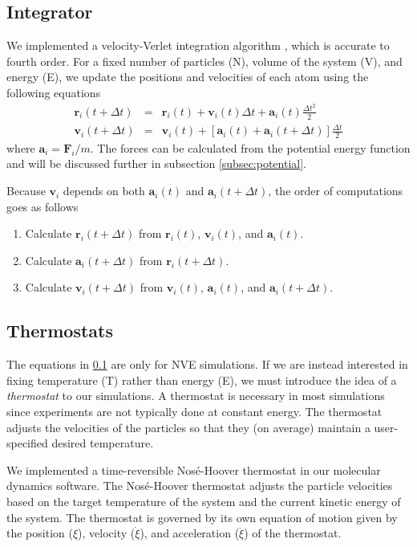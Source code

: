 \subsection{Integrator} \label{subsec:integrator}

We implemented a velocity-Verlet integration algorithm \cite{Swope1982}, which is accurate to fourth order.
%
For a fixed number of particles (N), volume of the system (V), and energy (E), we update the positions and velocities of each atom using the following equations
\begin{eqnarray}
\mathbf{r}_i (t + \Delta t)  & = & \mathbf{r}_i(t) + \mathbf{v}_i(t) \Delta t + \mathbf{a}_i(t) \frac{\Delta t^2}{2} \\
\mathbf{v}_i(t + \Delta t) & = & \mathbf{v}_i(t) + \left[\mathbf{a}_i(t) + \mathbf{a}_i(t + \Delta t) \right] \frac{\Delta t}{2}
\end{eqnarray}
where $\mathbf{a}_i = \mathbf{F}_i/m$.
%
The forces can be calculated from the potential energy function and will be discussed further in subsection \ref{subsec:potential}.

Because $\mathbf{v}_i$ depends on both $\mathbf{a}_i(t)$ and $\mathbf{a}_i(t+\Delta t)$, the order of computations goes as follows
\begin{enumerate}
\item Calculate $\mathbf{r}_i(t + \Delta t)$ from $\mathbf{r}_i(t)$, $\mathbf{v}_i(t)$, and $\mathbf{a}_i(t)$.
\item Calculate $\mathbf{a}_i(t + \Delta t)$ from $\mathbf{r}_i(t + \Delta t)$.
\item Calculate $\mathbf{v}_i(t + \Delta t)$ from $\mathbf{v}_i(t)$, $\mathbf{a}_i(t)$, and $\mathbf{a}_i(t + \Delta t)$.
\end{enumerate}

\subsection{Thermostats} \label{subsec:thermostat}
The equations in \ref{subsec:integrator} are only for NVE simulations.
%
If we are instead interested in fixing temperature (T) rather than energy (E), we must introduce the idea of a {\em thermostat} to our simulations.
%
A thermostat is necessary in most simulations since experiments are not typically done at constant energy.
%
The thermostat adjusts the velocities of the particles so that they (on average) maintain a user-specified desired temperature.

We implemented a time-reversible Nos\'{e}-Hoover thermostat in our molecular dynamics software.
%
The Nos\'{e}-Hoover thermostat adjusts the particle velocities based on the target temperature of the system and the current kinetic energy of the system.
%
The thermostat is governed by its own equation of motion given by the position ($\xi$), velocity ($\dot{\xi}$), and acceleration ($\ddot{\xi}$) of the thermostat.

